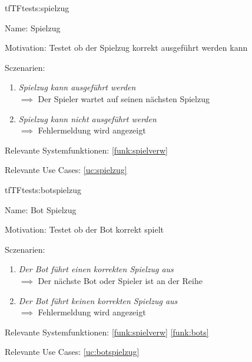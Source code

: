 \begin{description}[leftmargin=5em, style=sameline]

\begin{lhp}{tf}{TF}{tests:spielzug}
	\item [Name:] Spielzug
	\item [Motivation:] Testet ob der Spielzug korrekt ausgeführt werden kann
	\item [Sczenarien:] \hfill
		\begin{enumerate}
			\item \textit{ Spielzug kann ausgeführt werden} \\ $\implies$ Der Spieler wartet auf seinen nächsten Spielzug
			
			\item \textit{Spielzug kann nicht ausgeführt werden } \\ $\implies$ Fehlermeldung wird angezeigt
			
			
		\end{enumerate}
	\item [Relevante Systemfunktionen:] \ref{funk:spielverw}
	\item [Relevante Use Cases:] \ref{uc:spielzug}
\end{lhp}

\end{description}








\begin{description}[leftmargin=5em, style=sameline]

\begin{lhp}{tf}{TF}{tests:botspielzug}
	\item [Name:] Bot Spielzug
	\item [Motivation:] Testet ob der Bot korrekt spielt
	\item [Sczenarien:] \hfill
		\begin{enumerate}
			\item \textit{Der Bot führt einen korrekten Spielzug aus } \\ $\implies$  Der nächste Bot oder Spieler ist an der Reihe
			
			\item \textit{ Der Bot führt keinen korrekten Spielzug aus } \\ $\implies$ Fehlermeldung wird angezeigt
			
		\end{enumerate}
	\item [Relevante Systemfunktionen:] \ref{funk:spielverw} \ref{funk:bots}
	\item [Relevante Use Cases:] \ref{uc:botspielzug}
\end{lhp}

\end{description}





